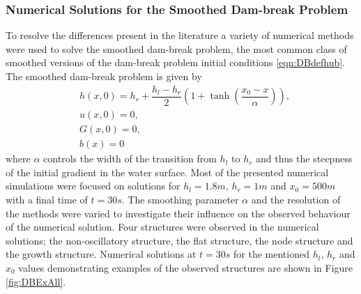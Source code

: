 \subsubsection{Numerical Solutions for the Smoothed Dam-break Problem}
To resolve the differences present in the literature a variety of numerical methods were used to solve the smoothed dam-break problem, the most common class of smoothed versions of the dam-break problem initial conditions \eqref{eqn:DBdefhub}. The smoothed dam-break problem is given by
\begin{subequations}
	\begin{align}
	&h(x,0) = h_r + \dfrac{h_l - h_r}{2} \left(1 +  \tanh\left(\dfrac{x_0 - x}{\alpha}\right) \right), \\
	&u(x,0) = 0 , \\
	&G(x,0) = 0 , \\
	&b(x) = 0
	\end{align}
	\label{eqn:SmoothDB}
\end{subequations}
where $\alpha$ controls the width of the transition from $h_l$ to $h_r$ and thus the steepness of the initial gradient in the water surface. Most of the presented numerical simulations were focused on solutions for $h_l = 1.8m$, $h_r = 1m$ and $x_0 = 500m$ with a final time of $t=30s$. The smoothing parameter $\alpha$ and the resolution of the methods were varied to investigate their influence on the observed behaviour of the numerical solution. Four structures were observed in the numerical solutions; the non-oscillatory structure, the flat structure, the node structure and the growth structure. Numerical solutions at $t=30s$ for the mentioned $h_l$, $h_r$ and $x_0$ values demonstrating examples of the observed structures are shown in Figure \ref{fig:DBExAll}. 
